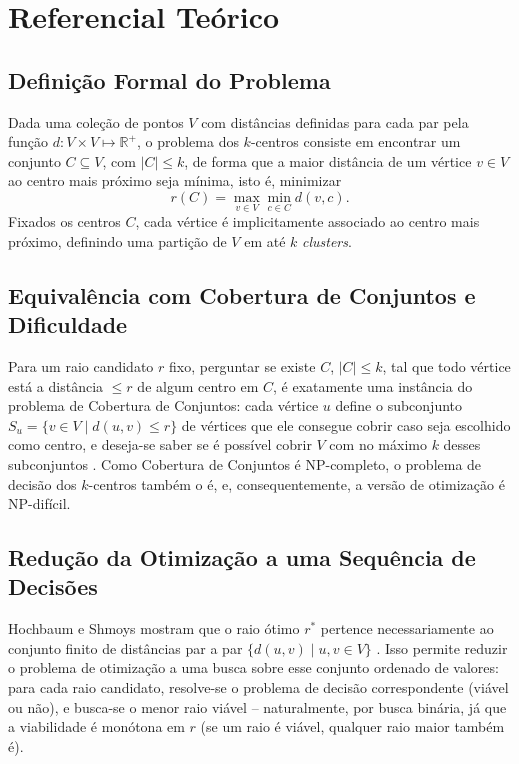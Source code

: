 \documentclass[10pt,twocolumn]{article}
\begin{document}
\section{Referencial Te\'orico}

\subsection{Defini\c{c}\~ao Formal do Problema}

Dada uma cole\c{c}\~ao de pontos $V$ com dist\^ancias definidas para cada par pela
fun\c{c}\~ao $d : V \times V \mapsto \mathbb{R}^{+}$, o problema dos $k$-centros consiste
em encontrar um conjunto $C \subseteq V$, com $|C| \leq k$, de forma que a maior
dist\^ancia de um v\'ertice $v \in V$ ao centro mais pr\'oximo seja m\'inima, isto \'e,
minimizar
\[
  r(C) = \max_{v \in V} \min_{c \in C} d(v, c).
\]
Fixados os centros $C$, cada v\'ertice \'e implicitamente associado ao centro mais
pr\'oximo, definindo uma parti\c{c}\~ao de $V$ em at\'e $k$ \emph{clusters}.

\subsection{Equival\^encia com Cobertura de Conjuntos e Dificuldade}

Para um raio candidato $r$ fixo, perguntar se existe $C$, $|C|\leq k$, tal que todo
v\'ertice est\'a a dist\^ancia $\leq r$ de algum centro em $C$, \'e exatamente uma
inst\^ancia do problema de Cobertura de Conjuntos: cada v\'ertice $u$ define o
subconjunto $S_u = \{v \in V \mid d(u,v) \leq r\}$ de v\'ertices que ele consegue cobrir
caso seja escolhido como centro, e deseja-se saber se \'e poss\'ivel cobrir $V$ com
no m\'aximo $k$ desses subconjuntos \cite{garey1979}. Como Cobertura de Conjuntos \'e
$\mathrm{NP}$-completo, o problema de decis\~ao dos $k$-centros tamb\'em o \'e, e,
consequentemente, a vers\~ao de otimiza\c{c}\~ao \'e $\mathrm{NP}$-dif\'icil.

\subsection{Redu\c{c}\~ao da Otimiza\c{c}\~ao a uma Sequ\^encia de Decis\~oes}

Hochbaum e Shmoys mostram que o raio \'otimo $r^{*}$ pertence necessariamente ao
conjunto finito de dist\^ancias par a par $\{d(u,v) \mid u,v \in V\}$
\cite{hochbaum1985}. Isso permite reduzir o problema de otimiza\c{c}\~ao a uma busca
sobre esse conjunto ordenado de valores: para cada raio candidato, resolve-se o problema
de decis\~ao correspondente (vi\'avel ou n\~ao), e busca-se o menor raio vi\'avel --
naturalmente, por busca bin\'aria, j\'a que a viabilidade \'e mon\'otona em $r$ (se um
raio \'e vi\'avel, qualquer raio maior tamb\'em \'e).
\end{document}
